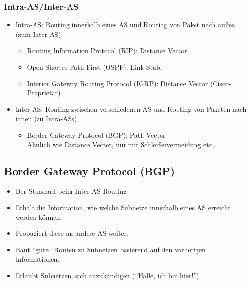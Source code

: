 \documentclass[a4paper, 11pt, accentcolor = tud3b]{tudreport}
\begin{document}
                \subsubsection{Intra-AS/Inter-AS}
                    \begin{itemize}
                    	\item Intra-AS: Routing innerhalb eines AS und Routing von Paket nach außen (zum Inter-AS)
	                    	\begin{itemize}
	                    		\item Routing Information Protocol (RIP): Distance Vector
	                    		\item Open Shortes Path First (OSPF): Link State
	                    		\item Interior Gateway Routing Protocol (IGRP): Distance Vector (Cisco-Proprietär)
	                    	\end{itemize}
                    	\item Inter-AS: Routing zwischen verschiedenen AS und Routing von Paketen nach innen (zu Intra-ASs)
	                    	\begin{itemize}
	                    		\item Border Gateway Protocol (BGP): Path Vector \\ Ähnlich wie Distance Vector, nur mit Schleifenvermeidung etc.
	                    	\end{itemize}
                    \end{itemize}

            \subsection{Border Gateway Protocol (BGP)}
                \begin{itemize}
                	\item Der Standard beim Inter-AS Routing
                	\item Erhält die Information, wie welche Subnetze innerhalb eines AS erreicht werden können.
                	\item Propagiert diese an andere AS weiter.
                	\item Baut \enquote{gute} Routen zu Subnetzen basierend auf den vorherigen Informationen.
                	\item Erlaubt Subnetzen, sich anzukündigen (\enquote{Halle, ich bin hier!}).
                \end{itemize}
                
\end{document}
